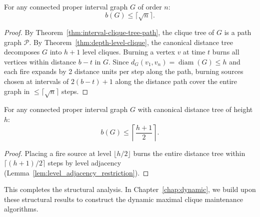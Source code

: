 \begin{theorem}
\label{thm:proper-interval-burning-bound}
For any connected proper interval graph $G$ of order $n$:
\begin{equation}
    b(G) \le \lceil \sqrt{n} \rceil.
\end{equation}
\end{theorem}
\begin{proof}
By Theorem~\ref{thm:interval-clique-tree-path}, the clique tree of $G$ is a path graph $\mathcal{P}$. By Theorem~\ref{thm:depth-level-clique}, the canonical distance tree decomposes $G$ into $h+1$ level cliques. Burning a vertex $v$ at time $t$ burns all vertices within distance $b - t$ in $G$. Since $d_G(v_1, v_n) = \operatorname{diam}(G) \le h$ and each fire expands by 2 distance units per step along the path, burning sources chosen at intervals of $2(b - t) + 1$ along the distance path cover the entire graph in $\le \lceil \sqrt{n} \rceil$ steps.
\end{proof}

\begin{theorem}
\label{thm:diameter-height-bound}
For any connected proper interval graph $G$ with canonical distance tree of height $h$:
\begin{equation}
    b(G) \le \left\lceil \frac{h+1}{2} \right\rceil.
\end{equation}
\end{theorem}
\begin{proof}
Placing a fire source at level $\lfloor h/2 \rfloor$ burns the entire distance tree within $\lceil (h+1)/2 \rceil$ steps by level adjacency (Lemma~\ref{lem:level_adjacency_restriction}).
\end{proof}

This completes the structural analysis. In Chapter~\ref{chap:dynamic}, we build upon these structural results to construct the dynamic maximal clique maintenance algorithms.

